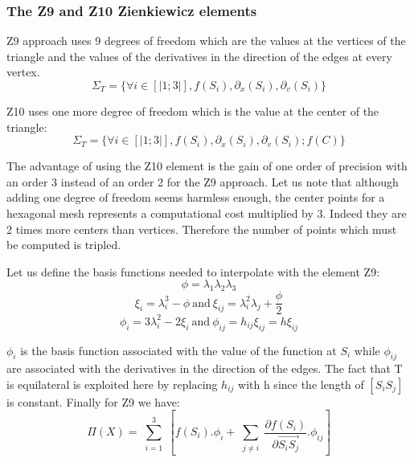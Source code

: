 \documentclass[proc]{edpsmath}
\begin{document}
\subsubsection{The Z9 and Z10 Zienkiewicz elements}
Z9 approach uses 9 degrees of freedom which are the values at the vertices of the triangle and the values of the derivatives in the direction of the edges at every vertex.
\begin{equation*}
 \Sigma_T = \lbrace \forall i \in [|1;3|], f(S_i),\partial_x(S_i),\partial_v(S_i) \rbrace 
\end{equation*}

 \noindent Z10 uses one more degree of freedom which is the value at the center of the triangle:
\begin{equation*}
 \Sigma_T = \lbrace \forall i \in [|1;3|], f(S_i),\partial_x(S_i),\partial_v(S_i); f(C) \rbrace 
\end{equation*}

 \noindent The advantage of using the Z10 element is the gain of one order of precision with an order 3 instead of an order 2 for the Z9 approach. Let us note that although adding one degree of freedom seems harmless enough, the center points for a hexagonal mesh represents a computational cost multiplied by 3. Indeed they are  2 times more centers than vertices. Therefore the number of points which must be computed is tripled. 
 
Let us define the basis functions needed to interpolate with the element Z9: 
\begin{equation*}
\phi = \lambda_1 \lambda_2 \lambda_3 
\end{equation*}
\begin{equation*}
\xi _i= \lambda_i^3 - \phi ~\text{and}~ \xi_{ij}= \lambda_{i}^2 \lambda_j + \frac{\phi}{2} 
\end{equation*}
\begin{equation*}
\phi_i = 3\lambda_{i}^2 -2 \xi_i ~\text{and} ~\phi_{ij} = h_{ij} \xi_{ij}=h \xi_{ij}
\end{equation*}


\noindent $\phi_i$ is the basis function associated with the value of the function at $S_i$ while $\phi_{ij}$ are associated with the derivatives in the direction of the edges.    
The fact that T is equilateral is exploited here by replacing $h_{ij}$ with h since the length of $ [S_iS_j]$ is constant. Finally for Z9 we have:
\begin{equation*}
 \Pi (X) = \sum \limits_{\substack{i=1 }}^{3}{ [f(S_i).\phi_i + \sum \limits_{\substack{j\neq i }}^{}{ \frac{\partial f(S_i)}{\partial  \overrightarrow{ S_i S_j } }.\phi_{ij} } ] } 
\end{equation*}
\end{document}
